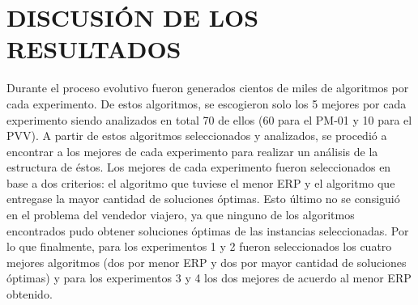 
\chapter{DISCUSIÓN DE LOS RESULTADOS}
\label{cap:discusion_resultados}


Durante el proceso evolutivo fueron generados cientos de miles de algoritmos por cada experimento. De estos algoritmos, se escogieron solo los 5 mejores por cada experimento siendo analizados en total 70 de ellos (60 para el PM-01 y 10 para el PVV). A partir de estos algoritmos seleccionados y analizados, se procedió a encontrar a los mejores de cada experimento para realizar un análisis de la estructura de éstos. Los mejores de cada experimento fueron seleccionados en base a dos criterios: el algoritmo que tuviese el menor ERP y el algoritmo que entregase la mayor cantidad de soluciones óptimas. Esto último no se consiguió en el problema del vendedor viajero, ya que ninguno de los algoritmos encontrados pudo obtener soluciones óptimas de las instancias seleccionadas. Por lo que finalmente, para los experimentos 1 y 2 fueron seleccionados los cuatro mejores algoritmos (dos por menor ERP y dos por mayor cantidad de soluciones óptimas) y para los experimentos 3 y 4 los dos mejores de acuerdo al menor ERP obtenido.

